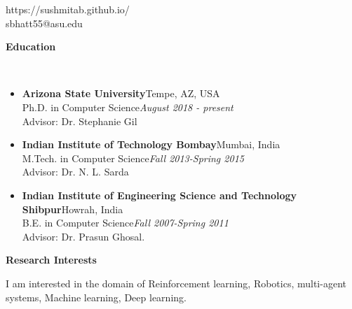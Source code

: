 \documentclass[a4paper,11pt]{article}
\newcommand{\lsep}{-0.5cm}
\newcommand{\resheading}[1]{{\small \colorbox{mygrey}{\begin{minipage}{0.975\textwidth}{\textbf{#1 \vphantom{p\^{E}}}}\end{minipage}}}}
\begin{document}
\hfill https://sushmitab.github.io/\\
\hfill sbhatt55@asu.edu\\
\setlength{\tabcolsep}{5pt}

\vspace{10pt}

\resheading{\textbf{\large Education} }\\[\lsep]
\begin{description}
\item 
\begin{itemize}
	
\item \textbf{Arizona State University}\hfill Tempe, AZ, USA\\
	Ph.D. in Computer Science\hfill \textit{August 2018 - present}\\
	Advisor: Dr. Stephanie Gil
\end{itemize}
\item
\begin{itemize}
\item \textbf{Indian Institute of Technology Bombay}\hfill Mumbai, India\\
	M.Tech. in Computer Science\hfill \textit{Fall 2013-Spring 2015}\\
	Advisor: Dr. N. L. Sarda
\end{itemize}
\item
\begin{itemize}
\item \textbf{Indian Institute of Engineering Science and Technology Shibpur}\hfill Howrah, India\\
	B.E. in Computer Science\hfill \textit{Fall 2007-Spring 2011}\\
	Advisor: Dr. Prasun Ghosal.
\end{itemize}
\end{description}

\resheading{\textbf{\large Research Interests}}
\begin{description}
	\item \hspace{0.75 cm} I am interested in the domain of Reinforcement learning, Robotics, multi-agent systems, Machine learning, Deep learning.
\end{description}
\end{document}
